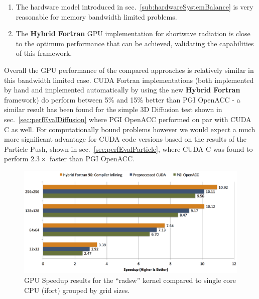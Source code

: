\begin{enumerate}
  \begin{enumerate}
   \item The hardware model introduced in sec.~\ref{sub:hardwareSystemBalance} is very reasonable for memory bandwidth limited problems.
   \item The \textbf{Hybrid Fortran} GPU implementation for shortwave radiation is close to the optimum performance that can be achieved, validating the capabilities of this framework.
  \end{enumerate}
\end{enumerate}

Overall the GPU performance of the compared approaches is relatively similar in this bandwidth limited case. CUDA Fortran implementations (both implemented by hand and implemented automatically by using the new \textbf{Hybrid Fortran} framework) do perform between 5\% and 15\% better than PGI OpenACC - a similar result has been found for the simple 3D Diffusion test shown in sec.~\ref{sec:perfEvalDiffusion} where PGI OpenACC performed on par with CUDA C as well. For computationally bound problems however we would expect a much more significant advantage for CUDA code versions based on the results of the Particle Push, shown in sec.~\ref{sec:perfEvalParticle}, where CUDA C was found to perform $2.3\times$ faster than PGI OpenACC.

\begin{figure}[htpb]
        \centering
        \includegraphics[width=14cm]{figures/verificationSpeedupVS1Core}
        \caption[GPU Speedup Results of Sample Implementation Compared to Single Core]{GPU Speedup results for the ``radsw'' kernel compared to single core CPU (ifort) grouped by grid sizes.}
        \label{figure:verificationSpeedupVS1Core}
\end{figure}

